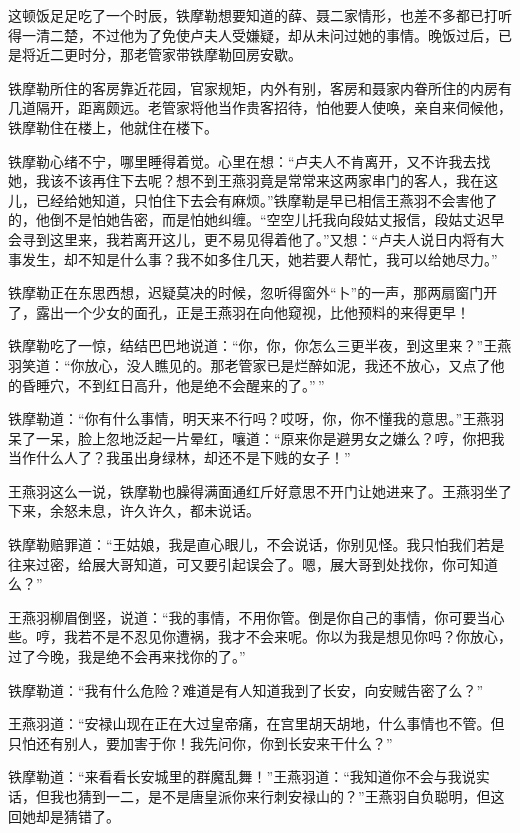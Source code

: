 \documentclass[12pt,oneside]{book}
\begin{document}
这顿饭足足吃了一个时辰，铁摩勒想要知道的薛、聂二家情形，也差不多都已打听得一清二楚，不过他为了免使卢夫人受嫌疑，却从未问过她的事情。晚饭过后，已是将近二更时分，那老管家带铁摩勒回房安歇。

铁摩勒所住的客房靠近花园，官家规矩，内外有别，客房和聂家内眷所住的内房有几道隔开，距离颇远。老管家将他当作贵客招待，怕他要人使唤，亲自来伺候他，铁摩勒住在楼上，他就住在楼下。

铁摩勒心绪不宁，哪里睡得着觉。心里在想：``卢夫人不肯离开，又不许我去找她，我该不该再住下去呢？想不到王燕羽竟是常常来这两家串门的客人，我在这儿，已经给她知道，只怕住下去会有麻烦。''铁摩勒是早已相信王燕羽不会害他了的，他倒不是怕她告密，而是怕她纠缠。``空空儿托我向段姑丈报信，段姑丈迟早会寻到这里来，我若离开这儿，更不易见得着他了。''又想：``卢夫人说日内将有大事发生，却不知是什么事？我不如多住几天，她若要人帮忙，我可以给她尽力。''

铁摩勒正在东思西想，迟疑莫决的时候，忽听得窗外``卜''的一声，那两扇窗门开了，露出一个少女的面孔，正是王燕羽在向他窥视，比他预料的来得更早！

铁摩勒吃了一惊，结结巴巴地说道：``你，你，你怎么三更半夜，到这里来？''王燕羽笑道：``你放心，没人瞧见的。那老管家已是烂醉如泥，我还不放心，又点了他的昏睡穴，不到红日高升，他是绝不会醒来的了。''\,''

铁摩勒道：``你有什么事情，明天来不行吗？哎呀，你，你不懂我的意思。''王燕羽呆了一呆，脸上忽地泛起一片晕红，嚷道：``原来你是避男女之嫌么？哼，你把我当作什么人了？我虽出身绿林，却还不是下贱的女子！''

王燕羽这么一说，铁摩勒也臊得满面通红斤好意思不开门让她进来了。王燕羽坐了下来，余怒未息，许久许久，都未说话。

铁摩勒赔罪道：``王姑娘，我是直心眼儿，不会说话，你别见怪。我只怕我们若是往来过密，给展大哥知道，可又要引起误会了。嗯，展大哥到处找你，你可知道么？''

王燕羽柳眉倒竖，说道：``我的事情，不用你管。倒是你自己的事情，你可要当心些。哼，我若不是不忍见你遭祸，我才不会来呢。你以为我是想见你吗？你放心，过了今晚，我是绝不会再来找你的了。''

铁摩勒道：``我有什么危险？难道是有人知道我到了长安，向安贼告密了么？''

王燕羽道：``安禄山现在正在大过皇帝痛，在宫里胡天胡地，什么事情也不管。但只怕还有别人，要加害于你！我先问你，你到长安来干什么？''

铁摩勒道：``来看看长安城里的群魔乱舞！''王燕羽道：``我知道你不会与我说实话，但我也猜到一二，是不是唐皇派你来行刺安禄山的？''王燕羽自负聪明，但这回她却是猜错了。
\end{document}
